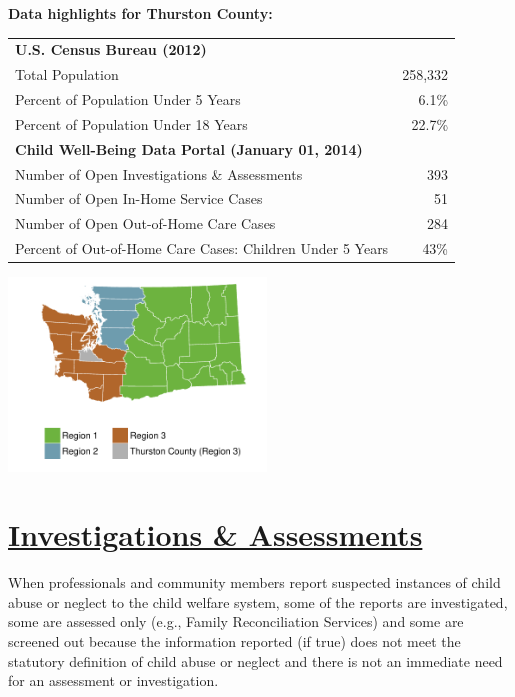 \documentclass{article}\usepackage[]{graphicx}\usepackage[]{color}
\begin{document}
\begin{minipage}{0.6\textwidth}
\textbf{Data highlights for Thurston County:}

\begin{tabular}{lr}
  \toprule
 \textbf{U.S. Census Bureau (2012)} &  \\ 
  \quad Total Population & 258,332 \\ 
  \quad Percent of Population Under 5 Years & 6.1\% \\ 
  \quad Percent of Population Under 18 Years & 22.7\% \\ 
  \textbf{Child Well-Being Data Portal (January 01, 2014)} &  \\ 
  \quad Number of Open Investigations \& Assessments & 393 \\ 
  \quad Number of Open In-Home Service Cases & 51 \\ 
  \quad Number of Open Out-of-Home Care Cases & 284 \\ 
  \quad Percent of Out-of-Home Care Cases: Children Under 5 Years & 43\% \\ 
   \bottomrule
\end{tabular}


\end{minipage}
\begin{minipage}{0.4\textwidth}

\begin{center}
\includegraphics[width=2.7in]{county_maps/Thurston-b}
\end{center}

\end{minipage}


\newpage
\restoregeometry
\section{\href{http://www.partnersforourchildren.org//data-portal/visualizations/investigations-assessments/trends}
{Investigations \& Assessments}}
When professionals and community members report suspected instances of child abuse or neglect to the child welfare system, some of the reports are investigated, some are assessed only (e.g., Family Reconciliation Services) and some are screened out because the information reported (if true) does not meet the statutory definition of child abuse or neglect and there is not an immediate need for an assessment or investigation.\\[6pt]
\label{p:ia}
\end{document}
